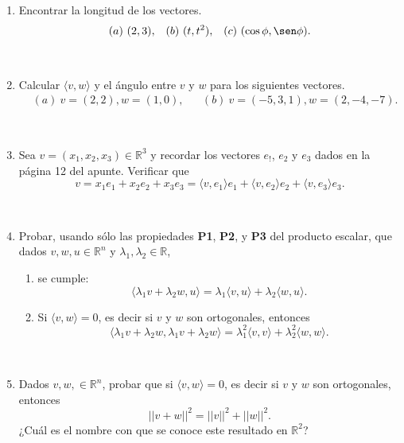 \documentclass[11pt,spanish,makeidx,reqno]{amsbook}
\begin{document}
\begin{enumerate}
\



\ 
\item Encontrar la longitud de los vectores.
\begin{align*}
&(a) \ (2,3), && (b) \ (t,t^2), & (c) \ (\cos\phi,\sen\phi).
\end{align*}

\

\item Calcular $\langle v , w  \rangle$ y el {\'a}ngulo entre $v$ y $w$  para los siguientes vectores.
\begin{align*}
&(a) \ v=(2,2), w=(1,0), &&  (b) \  v=(-5,3,1), w=(2,-4,-7).
\end{align*}

\

\item Sea $v=(x_1,x_2,x_3)\in\mathbb{R}^3$ y recordar los vectores $e_!$, $e_2$ y $e_3$ dados en la p\'agina 12 del apunte. Verificar que 
$$v=x_1e_1+x_2e_2+x_3e_3=\langle v,e_1\rangle e_1+\langle v,e_2\rangle e_2+\langle v,e_3\rangle e_3.$$

\

\item Probar, usando sólo las propiedades \textbf{P1}, \textbf{P2}, y \textbf{P3} del producto escalar, que dados $v, w, u \in \mathbb R^n$ y $\lambda_1, \lambda_2 \in \mathbb R$, 
\begin{enumerate}
	\item se cumple:
	\begin{equation*}
	\langle \lambda_1 v + \lambda_2 w , u  \rangle =  \lambda_1\langle v , u  \rangle +   \lambda_2\langle w , u  \rangle.
	\end{equation*}
	\item Si $\langle v , w  \rangle =0$, es decir si $v$ y $w$ son ortogonales,  entonces
	\begin{equation*}
		\langle \lambda_1 v + \lambda_2 w ,  \lambda_1 v + \lambda_2 w   \rangle =
		\lambda_1^2 \langle  v ,  v  \rangle + \lambda_2^2 \langle w,w  \rangle.
	\end{equation*}
\end{enumerate}


\


\item Dados $v, w,\in \mathbb R^n$, probar que si  $\langle v , w  \rangle =0$, es decir si $v$ y $w$ son ortogonales,  entonces
	\begin{equation*}
	||v + w||^2 = ||v||^2 + ||w||^2.
	\end{equation*}
	¿Cuál es el nombre con que se conoce este resultado en $\mathbb R^2$?
	


\end{enumerate}
\end{document}
